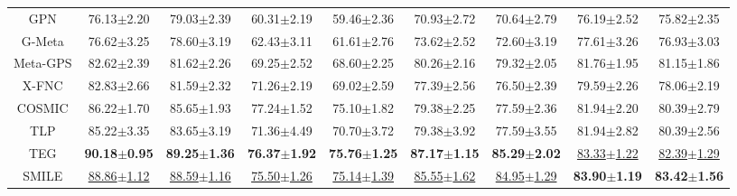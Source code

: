 \begin{table*}[ht]
{\begin{tabular}{@{}c|cccccccc@{}}
GPN                    & 76.13$\pm$2.20            & 79.03$\pm$2.39            & 60.31$\pm$2.19          & 59.46$\pm$2.36          & 70.93$\pm$2.72              & 70.64$\pm$2.79             & 76.19$\pm$2.52          & 75.82$\pm$2.35          \\
G-Meta                 & 76.62$\pm$3.25            & 78.60$\pm$3.19            & 62.43$\pm$3.11          & 61.61$\pm$2.76          & 73.62$\pm$2.52              & 72.60$\pm$3.19             & 77.61$\pm$3.26          & 76.93$\pm$3.03          \\
Meta-GPS               & 82.62$\pm$2.39            & 81.62$\pm$2.26            & 69.25$\pm$2.52          & 68.60$\pm$2.25          & 80.26$\pm$2.16        & 79.32$\pm$2.05       & 81.76$\pm$1.95          & 81.15$\pm$1.86    \\
X-FNC                  & 82.83$\pm$2.66            & 81.59$\pm$2.32            & 71.26$\pm$2.19          & 69.02$\pm$2.59          & 77.39$\pm$2.56              & 76.50$\pm$2.39             & 79.59$\pm$2.26          & 78.06$\pm$2.19          \\ 
COSMIC                   & 86.22$\pm$1.70      & 85.65$\pm$1.93      & 77.24$\pm$1.52    & 75.10$\pm$1.82    & 79.38$\pm$2.25              & 77.59$\pm$2.36             & 81.94$\pm$2.20    & 80.39$\pm$2.79          \\ 
TLP                   & 85.22$\pm$3.35      & 83.65$\pm$3.19      & 71.36$\pm$4.49    & 70.70$\pm$3.72    & 79.38$\pm$3.92              & 77.59$\pm$3.55             & 81.94$\pm$2.82    & 80.39$\pm$2.56          \\
TEG                   & \textbf{90.18$\pm$0.95}      & \textbf{89.25$\pm$1.36}      & \textbf{76.37$\pm$1.92}    & \textbf{75.76$\pm$1.25}    & \textbf{87.17$\pm$1.15}              & \textbf{85.29$\pm$2.02}             & \underline{83.33$\pm$1.22}    & \underline{82.39$\pm$1.29}          \\
\midrule
SMILE                  & \underline{88.86$\pm$1.12}   & \underline{88.59$\pm$1.16}   & \underline{75.50$\pm$1.26} & \underline{75.14$\pm$1.39} & \underline{85.55$\pm$1.62}     & \underline{84.95$\pm$1.29}    & \textbf{83.90$\pm$1.19} & \textbf{83.42$\pm$1.56} \\ \bottomrule
\end{tabular} %
}
\end{table*}


